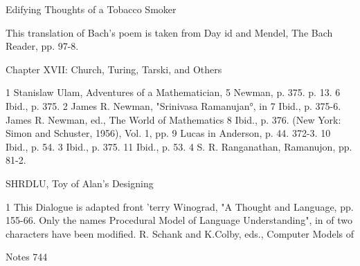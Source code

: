                                  Edifying Thoughts of a Tobacco Smoker

This translation of Bach's poem is taken from Day id and Mendel, The Bach Reader, pp. 97-8.

                         Chapter XVII: Church, Turing, Tarski, and Others

1 Stanislaw Ulam, Adventures of a Mathematician,      5 Newman, p. 375.
p. 13.                                                6 Ibid., p. 375.
2 James R. Newman, "Srinivasa Ramanujan°, in          7 Ibid., p. 375-6.
James R. Newman, ed., The World of Mathematics        8 Ibid., p. 376.
(New York: Simon and Schuster, 1956), Vol. 1, pp.     9 Lucas in Anderson, p. 44.
372-3.                                                10 Ibid., p. 54.
3 Ibid., p. 375.                                      11 Ibid., p. 53.
4 S. R. Ranganathan, Ramanujon, pp. 81-2.


                                   SHRDLU, Toy of Alan's Designing

1 This Dialogue is adapted front 'terry Winograd, "A Thought and Language, pp. 155-66. Only the names
Procedural Model of Language Understanding", in      of two characters have been modified.
R. Schank and K.Colby, eds., Computer Models of




Notes                                                                                                744

